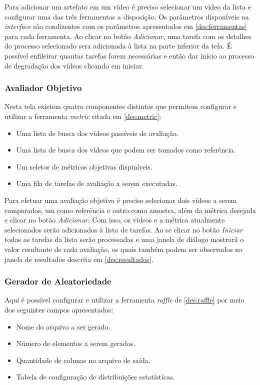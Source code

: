 Para adicionar um artefato em um vídeo é preciso selecionar um vídeo da lista e configurar uma das três ferramentas a disposição. 
Os parâmetros disponíveis na \emph{interface} são condizentes com os parâmetros apresentados em \ref{des:ferramentas} para cada ferramenta.
Ao clicar no botão \emph{Adicionar}, uma tarefa com os detalhes do processo selecionado sera adicionada à lista na parte inferior da tela. É possível enfileirar quantas tarefas forem necessárias e então dar início ao processo de degradação dos vídeos clicando em iniciar.

\subsubsection{Avaliador Objetivo}

Nesta tela existem quatro componentes distintos que permitem configurar e utilizar a ferramenta \emph{metric} citada em \ref{des:metric}:

\begin{itemize}
	\item Uma lista de busca dos vídeos passíveis de avaliação.
	\item Uma lista de busca dos vídeos que podem ser tomados como referência.
	\item Um seletor de métricas objetivas dispiníveis.
	\item Uma fila de tarefas de avaliação a serem executadas.
\end{itemize}

Para efetuar uma avaliação objetiva é preciso selecionar dois vídeos a serem comparados, um como referência e outro como amostra, além da métrica desejada e clicar no botão \emph{Adicionar}.
Com isso, os vídeos e a métrica atualmente selecionados serão adicionados à lista de tarefas. 
Ao se clicar no botão \emph{Iniciar} todas as tarefas da lista serão processadas e uma janela de diálogo mostrará o valor resultante de cada avaliação, os quais também podem ser observados na janela de resultados descrita em \ref{des:resultados}.

\subsubsection{Gerador de Aleatoriedade}

Aqui é possível configurar e utilizar a ferramenta \emph{raffle} de \ref{des:raffle} por meio dos seguintes campos apresentados:

\begin{itemize}
	\item Nome do arquivo a ser gerado.
	\item Número de elementos a serem gerados.
	\item Quantidade de colunas no arquivo de saída.
	\item Tabela de configuração de distribuições estatísticas.
\end{itemize}

